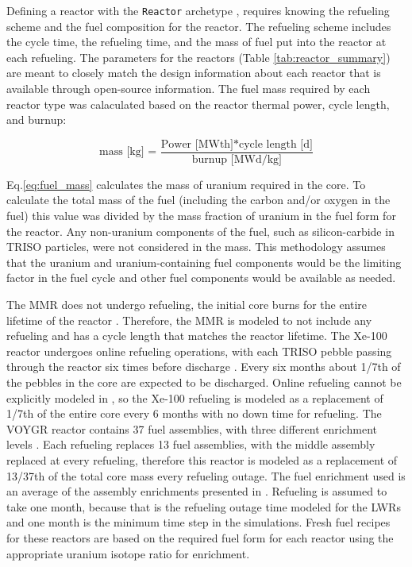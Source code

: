 Defining a reactor with the \Cycamore \texttt{Reactor} archetype 
\cite{scopatz_cyclus_2015}, 
requires knowing the refueling scheme and the fuel composition for 
the reactor. The refueling scheme includes 
the cycle time, the refueling time, and the mass of fuel put into the reactor 
at each refueling. The parameters for the reactors (Table \ref{tab:reactor_summary})
are meant to closely match the design information about each reactor that 
is available through open-source information. The fuel mass required by 
each reactor type was calaculated based on the reactor thermal power, 
cycle length, and burnup:

\begin{equation}
    \text{mass [kg] = }\frac{\text{Power [MWth]}* \text{cycle 
    length [d]}}{\text{burnup [MWd/kg]}}
    \label{eq:fuel_mass}
\end{equation}

\noindent Eq.\ref{eq:fuel_mass} calculates the mass of uranium required 
in the core. To calculate the total mass of the fuel (including the carbon 
and/or oxygen in the fuel) this value was divided by the mass fraction of 
uranium in the fuel form for the reactor. Any non-uranium components 
of the fuel, such as silicon-carbide in \gls{TRISO} particles, were 
not considered in the mass. This methodology assumes that the 
uranium and uranium-containing fuel components would be the limiting 
factor in the fuel cycle and other fuel components would be available as 
needed. 

The \gls{MMR} does not undergo refueling, the initial core
burns for the entire lifetime of the reactor \cite{mitchell_usnc_2020}. 
Therefore, the \gls{MMR}
is modeled to not include any refueling and has a cycle length that 
matches the reactor lifetime.  
The Xe-100 reactor undergoes online refueling operations, with each 
\gls{TRISO} pebble passing 
through the reactor six times before discharge \cite{mulder_overview_2021}. 
Every six months about 1/7th 
of the pebbles in the core are expected to be discharged. Online refueling 
cannot be explicitly modeled in \Cyclus, so the Xe-100 refueling is modeled 
as a replacement of 1/7th of the entire core every 6 months with no down time 
for refueling.  
The VOYGR reactor contains 37 fuel assemblies, with three different enrichment 
levels \cite{nuscale_chapter_2020-1}. Each refueling replaces 13 fuel assemblies, 
with the middle assembly replaced at every refueling, therefore this reactor 
is modeled as a replacement of 13/37th of the total core mass every 
refueling outage. 
The fuel enrichment used is an average of the assembly enrichments 
presented in \cite{nuscale_chapter_2020-1}. Refueling is assumed to 
take one month, because that is the refueling outage time 
modeled for the \glspl{LWR} and one month is the minimum time step in the 
simulations. Fresh fuel recipes for these reactors are based on the 
required fuel form for each reactor using the appropriate uranium isotope 
ratio for enrichment. 

